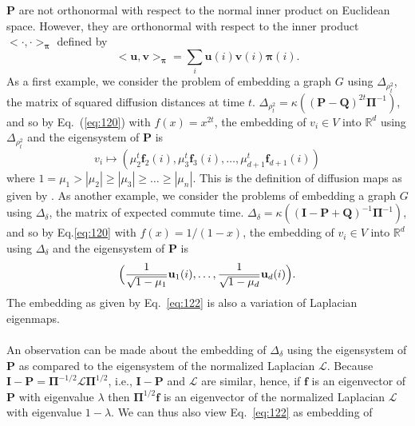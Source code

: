 $\mathbf{P}$ are not orthonormal with respect to the normal inner
product on Euclidean space. However, they are orthonormal with respect
to the inner product $<\cdot,\cdot>_{\bm{\pi}}$ defined by
\begin{equation}
  \label{eq:121}
  <\mathbf{u},\mathbf{v}>_{\bm{\pi}} =
  \sum_{i}{\mathbf{u}(i)\mathbf{v}(i) \bm{\pi}(i)}.
\end{equation}
As a first example, we consider the problem of embedding a graph $G$
using $\Delta_{\rho_t^2}$, the matrix of squared diffusion distances
at time $t$. $\Delta_{\rho_t^2} = \kappa((\mathbf{P} -
\mathbf{Q})^{2t} \bm{\Pi}^{-1})$, and so by Eq.~(\ref{eq:120}) with
$f(x) = x^{2t}$, the embedding of $v_i \in V$ into $\mathbb{R}^{d}$
using $\Delta_{\rho_t^2}$ and the eigensystem of $\mathbf{P}$ is  
\begin{equation}
  \label{eq:124}
  v_i \mapsto (\mu_{2}^{t} \mathbf{f}_{2}(i), \mu_{3}^{t}
  \mathbf{f}_{3}(i), \dots, \mu_{d+1}^{t} \mathbf{f}_{d+1}(i))
\end{equation}
where $1 = \mu_1 > |\mu_2| \geq |\mu_3| \geq \dots \geq |\mu_{n}|$.
This is the definition of diffusion maps as given by
\citet{coifman06:_diffus_maps}.  As another example, we consider the
problems of embedding a graph $G$ using $\Delta_\delta$, the matrix of
expected commute time.  $\Delta_\delta = \kappa((\mathbf{I} -
\mathbf{P} + \mathbf{Q})^{-1}\bm{\Pi}^{-1})$, and so by
Eq.\eqref{eq:120} with $f(x) = 1/(1-x)$, the embedding of $v_i \in V$
into $\mathbb{R}^{d}$ using $\Delta_\delta$ and the eigensystem of
$\mathbf{P}$ is
\begin{equation}
  \label{eq:122}
   \Bigl(\frac{1}{\sqrt{1 - \mu_1}} \mathbf{u}_1(i),
    \dots, \frac{1}{\sqrt{1 - \mu_d}} \mathbf{u}_{d}(i)\Bigr).
\end{equation}
The embedding as given by Eq.~\eqref{eq:122} is also a variation of
Laplacian eigenmaps. \\ \\
\noindent
An observation can be made about the embedding of $\Delta_{\delta}$
using the eigensystem of $\mathbf{P}$ as compared to the eigensystem
of the normalized Laplacian $\bm{\mathcal{L}}$. Because $\mathbf{I} -
\mathbf{P} = \bm{\Pi}^{-1/2}\bm{\mathcal{L}}\bm{\Pi}^{1/2}$, i.e.,
$\mathbf{I} - \mathbf{P}$ and $\bm{\mathcal{L}}$ are similar, hence,
if $\mathbf{f}$ is an eigenvector of $\mathbf{P}$ with eigenvalue
$\lambda$ then $\bm{\Pi}^{1/2}\mathbf{f}$ is an eigenvector of the
normalized Laplacian $\bm{\mathcal{L}}$ with eigenvalue $1 -
\lambda$. We can thus also view Eq.~\eqref{eq:122} as embedding of
